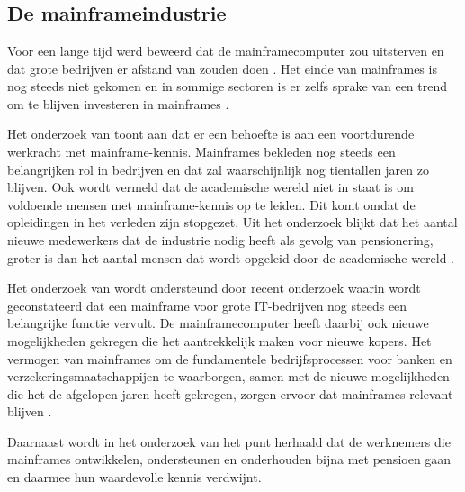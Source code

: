 \chapter{}%
\label{ch:literatuurstudie}


\section{De mainframeindustrie}

Voor een lange tijd werd beweerd dat de mainframecomputer zou uitsterven en dat grote bedrijven er afstand van zouden doen \autocite{Sagers_Ball_Hosack_Twitchell_Wallace_2018}. Het einde van mainframes is nog steeds niet gekomen en in sommige sectoren is er zelfs sprake van een trend om te blijven investeren in mainframes \autocite{Sagers_Ball_Hosack_Twitchell_Wallace_2018}.  

Het onderzoek van \textcite{Sagers_Ball_Hosack_Twitchell_Wallace_2018} toont aan dat er een behoefte is aan een voortdurende werkracht met mainframe-kennis. Mainframes bekleden nog steeds een belangrijken rol in bedrijven en dat zal waarschijnlijk nog tientallen jaren zo blijven. Ook wordt vermeld dat de academische wereld niet in staat is om voldoende mensen met mainframe-kennis op te leiden. Dit komt omdat de opleidingen in het verleden zijn stopgezet. Uit het onderzoek blijkt dat het aantal nieuwe medewerkers dat de industrie nodig heeft als gevolg van pensionering, groter is dan het aantal mensen dat wordt opgeleid door de academische wereld \autocite{Sagers_Ball_Hosack_Twitchell_Wallace_2018}. 

Het onderzoek van \textcite{Sagers_Ball_Hosack_Twitchell_Wallace_2018} wordt ondersteund door recent onderzoek waarin wordt geconstateerd dat een mainframe voor grote IT-bedrijven nog steeds een belangrijke functie vervult. De mainframecomputer heeft daarbij ook nieuwe mogelijkheden gekregen die het aantrekkelijk maken voor nieuwe kopers. Het vermogen van mainframes om de fundamentele bedrijfsprocessen voor banken en verzekeringsmaatschappijen te waarborgen, samen met de nieuwe mogelijkheden die het de afgelopen jaren heeft gekregen, zorgen ervoor dat mainframes relevant blijven \autocite{shaik_2024}.

Daarnaast wordt in het onderzoek van \textcite{waites_ketterer_2013} het punt herhaald dat de werknemers die mainframes ontwikkelen, ondersteunen en onderhouden bijna met pensioen gaan en daarmee hun waardevolle kennis verdwijnt.

